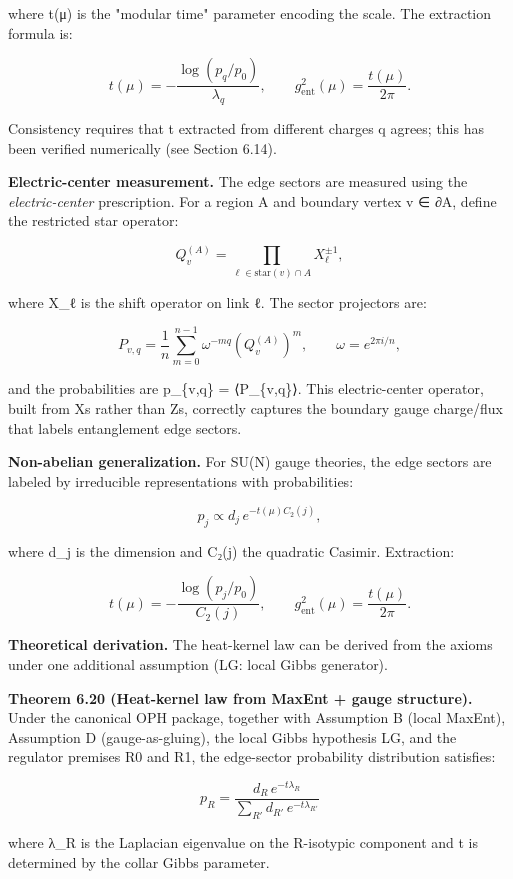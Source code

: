 where t(μ) is the "modular time" parameter encoding the scale. The extraction formula is:

\[
t(\mu) = -\frac{\log(p_q/p_0)}{\lambda_q}, \qquad
g_{\mathrm{ent}}^2(\mu) = \frac{t(\mu)}{2\pi}.
\]

Consistency requires that t extracted from different charges q agrees; this has been verified numerically (see Section 6.14).

\textbf{Electric-center measurement.} The edge sectors are measured using the \emph{electric-center} prescription. For a region A and boundary vertex v ∈ ∂A, define the restricted star operator:

\[
Q_v^{(A)} = \prod_{\ell \in \mathrm{star}(v) \cap A} X_\ell^{\pm 1},
\]

where X\_ℓ is the shift operator on link ℓ. The sector projectors are:

\[
P_{v,q} = \frac{1}{n} \sum_{m=0}^{n-1} \omega^{-mq} \left(Q_v^{(A)}\right)^m,
\qquad \omega = e^{2\pi i/n},
\]

and the probabilities are p\_\{v,q\} = ⟨P\_\{v,q\}⟩. This electric-center operator, built from X\textquotesingle s rather than Z\textquotesingle s, correctly captures the boundary gauge charge/flux that labels entanglement edge sectors.

\textbf{Non-abelian generalization.} For SU(N) gauge theories, the edge sectors are labeled by irreducible representations with probabilities:

\[
p_j \propto d_j \, e^{-t(\mu) C_2(j)},
\]

where d\_j is the dimension and C₂(j) the quadratic Casimir. Extraction:

\[
t(\mu) = -\frac{\log(p_j/p_0)}{C_2(j)}, \qquad
g_{\mathrm{ent}}^2(\mu) = \frac{t(\mu)}{2\pi}.
\]

\textbf{Theoretical derivation.} The heat-kernel law can be derived from the axioms under one additional assumption (LG: local Gibbs generator).

\textbf{Theorem 6.20 (Heat-kernel law from MaxEnt + gauge structure).} Under the canonical OPH package, together with Assumption B (local MaxEnt), Assumption D (gauge-as-gluing), the local Gibbs hypothesis LG, and the regulator premises R0 and R1, the edge-sector probability distribution satisfies:

\[
p_R = \frac{d_R \, e^{-t \lambda_R}}{\sum_{R'} d_{R'} \, e^{-t \lambda_{R'}}}
\]

where λ\_R is the Laplacian eigenvalue on the R-isotypic component and t is determined by the collar Gibbs parameter.

